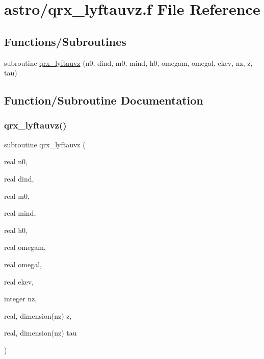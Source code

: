 \hypertarget{qrx__lyftauvz_8f}{}\section{astro/qrx\+\_\+lyftauvz.f File Reference}
\label{qrx__lyftauvz_8f}
\subsection*{Functions/\+Subroutines}
\begin{DoxyCompactItemize}
\item 
subroutine \hyperlink{qrx__lyftauvz_8f_a47ab6665a4921eb2023f217358f7f2da}{qrx\+\_\+lyftauvz} (n0, dind, m0, mind, h0, omegam, omegal, ekev, nz, z, tau)
\end{DoxyCompactItemize}


\subsection{Function/\+Subroutine Documentation}
\mbox{\label{qrx__lyftauvz_8f_a47ab6665a4921eb2023f217358f7f2da}} 
\subsubsection{\texorpdfstring{qrx\+\_\+lyftauvz()}{qrx\_lyftauvz()}}
{\footnotesize\ttfamily subroutine qrx\+\_\+lyftauvz (\begin{DoxyParamCaption}\item[{real}]{n0,  }\item[{real}]{dind,  }\item[{real}]{m0,  }\item[{real}]{mind,  }\item[{real}]{h0,  }\item[{real}]{omegam,  }\item[{real}]{omegal,  }\item[{real}]{ekev,  }\item[{integer}]{nz,  }\item[{real, dimension(nz)}]{z,  }\item[{real, dimension(nz)}]{tau }\end{DoxyParamCaption})}

